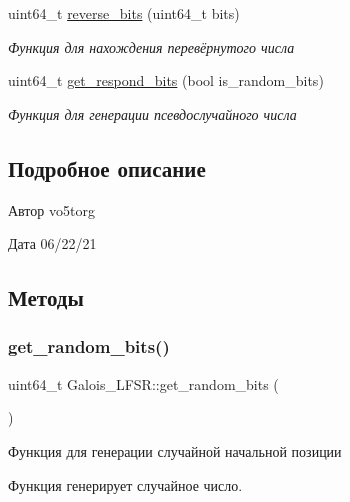 \begin{DoxyCompactItemize}
uint64\+\_\+t \hyperlink{classGalois__LFSR_ae8b9c21348f0f6f75c539e7a8667be88}{reverse\+\_\+bits} (uint64\+\_\+t bits)
\begin{DoxyCompactList}\small\item\em Функция для нахождения перевёрнутого числа \end{DoxyCompactList}\item 
uint64\+\_\+t \hyperlink{classGalois__LFSR_a1ceda4d66d840ff703cd14a3919b2f8b}{get\+\_\+respond\+\_\+bits} (bool is\+\_\+random\+\_\+bits)
\begin{DoxyCompactList}\small\item\em Функция для генерации псевдослучайного числа \end{DoxyCompactList}\end{DoxyCompactItemize}


\subsection{Подробное описание}
\begin{DoxyAuthor}{Автор}
vo5torg 
\end{DoxyAuthor}
\begin{DoxyDate}{Дата}
06/22/21 
\end{DoxyDate}


\subsection{Методы}
\mbox{\label{classGalois__LFSR_abc5cfd0aa22803188a1f81a5959f22eb}} 
\subsubsection{\texorpdfstring{get\+\_\+random\+\_\+bits()}{get\_random\_bits()}}
{\footnotesize\ttfamily uint64\+\_\+t Galois\+\_\+\+L\+F\+S\+R\+::get\+\_\+random\+\_\+bits (\begin{DoxyParamCaption}{ }\end{DoxyParamCaption})}



Функция для генерации случайной начальной позиции 

Функция генерирует случайное число.

